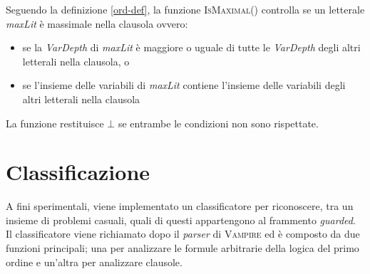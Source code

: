 Seguendo la definizione \ref{ord-def}, la funzione \textsc{IsMaximal}() controlla se 
un letterale \emph{maxLit} è massimale nella clausola ovvero:
\begin{itemize}
    \item se la \emph{VarDepth} di \emph{maxLit} è maggiore o uguale di tutte le \emph{VarDepth} degli altri letterali nella clausola, o
    \item se l'insieme delle variabili di \emph{maxLit} contiene l'insieme delle variabili degli altri letterali nella clausola
\end{itemize}
La funzione restituisce $\bot$ se entrambe le condizioni non sono rispettate.
\section{Classificazione}\label{class}
A fini sperimentali, viene implementato un classificatore per riconoscere, tra un insieme di problemi casuali,
quali di questi appartengono al frammento \emph{guarded}.
Il classificatore viene richiamato dopo il \emph{parser} di \textsc{Vampire} 
ed è composto da due funzioni principali; una per analizzare le formule arbitrarie della logica del primo ordine e un'altra per analizzare clausole.

